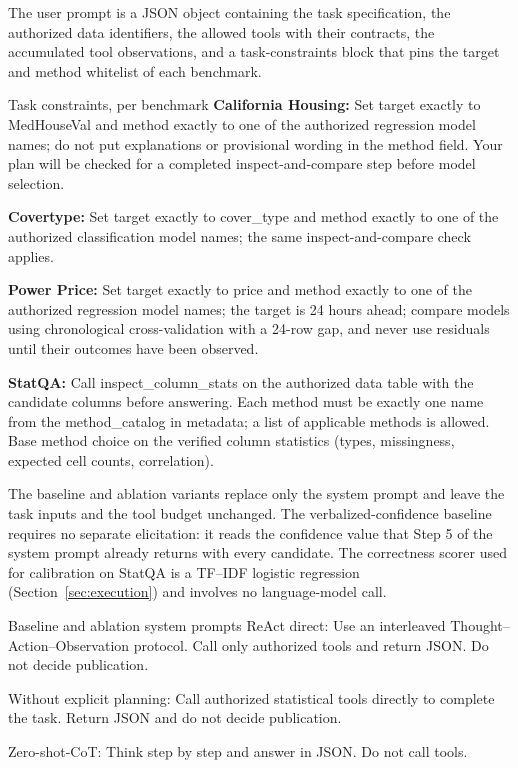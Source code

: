 \documentclass[preprint,12pt,authoryear]{elsarticle}
\begin{document}
The user prompt is a JSON object containing the task specification, the authorized data identifiers, the allowed tools with their contracts, the accumulated tool observations, and a task-constraints block that pins the target and method whitelist of each benchmark.


\begin{promptbox}{Task constraints, per benchmark}
\textbf{\textrm{California Housing:}} Set target exactly to MedHouseVal and method exactly to
one of the authorized regression model names; do not put explanations or
provisional wording in the method field. Your plan will be checked for a
completed inspect-and-compare step before model selection.

\textbf{\textrm{Covertype:}} Set target exactly to cover\_type and method exactly to one of
the authorized classification model names; the same inspect-and-compare
check applies.

\textbf{\textrm{Power Price:}} Set target exactly to price and method exactly to one of the
authorized regression model names; the target is 24 hours ahead; compare
models using chronological cross-validation with a 24-row gap, and never use
residuals until their outcomes have been observed.

\textbf{\textrm{StatQA:}} Call inspect\_column\_stats on the authorized data table with the
candidate columns before answering. Each method must be exactly one name
from the method\_catalog in metadata; a list of applicable methods is
allowed. Base method choice on the verified column statistics (types,
missingness, expected cell counts, correlation).
\end{promptbox}


The baseline and ablation variants replace only the system prompt and leave the task inputs and the tool budget unchanged.
The verbalized-confidence baseline requires no separate elicitation: it reads the confidence value that Step 5 of the system prompt already returns with every candidate.
The correctness scorer used for calibration on StatQA is a TF--IDF logistic regression (Section~\ref{sec:execution}) and involves no language-model call.


\begin{promptbox}{Baseline and ablation system prompts}
ReAct direct: Use an interleaved Thought--Action--Observation protocol.
Call only authorized tools and return JSON. Do not decide publication.

Without explicit planning: Call authorized statistical tools directly to
complete the task. Return JSON and do not decide publication.

Zero-shot-CoT: Think step by step and answer in JSON. Do not call tools.
\end{promptbox}
\end{document}
